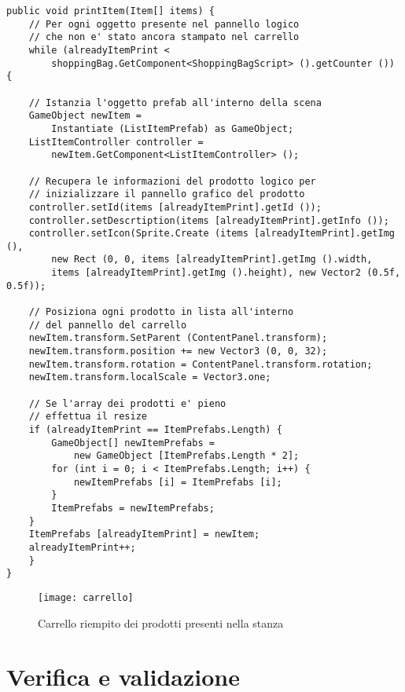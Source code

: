 \begin{lstlisting}[style=MyCStyle]
public void printItem(Item[] items) {
	// Per ogni oggetto presente nel pannello logico
	// che non e' stato ancora stampato nel carrello
	while (alreadyItemPrint < 
		shoppingBag.GetComponent<ShoppingBagScript> ().getCounter ()) {

	// Istanzia l'oggetto prefab all'interno della scena
	GameObject newItem = 
		Instantiate (ListItemPrefab) as GameObject;
	ListItemController controller = 
		newItem.GetComponent<ListItemController> ();

	// Recupera le informazioni del prodotto logico per 
	// inizializzare il pannello grafico del prodotto
	controller.setId(items [alreadyItemPrint].getId ());
	controller.setDescrtiption(items [alreadyItemPrint].getInfo ());
	controller.setIcon(Sprite.Create (items [alreadyItemPrint].getImg (), 
		new Rect (0, 0, items [alreadyItemPrint].getImg ().width, 
		items [alreadyItemPrint].getImg ().height), new Vector2 (0.5f, 0.5f));

	// Posiziona ogni prodotto in lista all'interno
	// del pannello del carrello
	newItem.transform.SetParent (ContentPanel.transform);
	newItem.transform.position += new Vector3 (0, 0, 32);
	newItem.transform.rotation = ContentPanel.transform.rotation;
	newItem.transform.localScale = Vector3.one;

	// Se l'array dei prodotti e' pieno
	// effettua il resize
	if (alreadyItemPrint == ItemPrefabs.Length) {
		GameObject[] newItemPrefabs = 
			new GameObject [ItemPrefabs.Length * 2];
		for (int i = 0; i < ItemPrefabs.Length; i++) {
			newItemPrefabs [i] = ItemPrefabs [i];
		}
		ItemPrefabs = newItemPrefabs;
	}
	ItemPrefabs [alreadyItemPrint] = newItem;
	alreadyItemPrint++;
	}
}
\end{lstlisting}

\label{Carrello}
\begin{figure}[ht]
	\begin{center}
		\texttt{[image: carrello]}
		\caption{Carrello riempito dei prodotti presenti nella stanza}
	\end{center}
\end{figure}
\FloatBarrier 

\section{Verifica e validazione}

